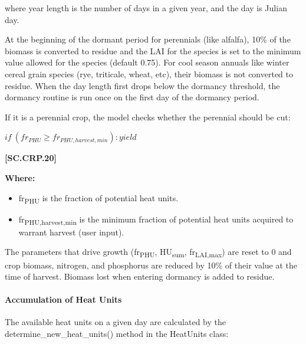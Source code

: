 where year length is the number of days in a given year, and the day is Julian day.

At the beginning of the dormant period for perennials (like alfalfa), 10\% of the biomass is converted to residue and the LAI for the species is set to the minimum value allowed for the species (default 0.75). For cool season annuals like winter cereal grain species (rye, triticale, wheat, etc), their biomass is not converted to residue.
When the day length first drops below the dormancy threshold, the dormancy routine is run once on the first day of the dormancy period.

If it is a perennial crop, the model checks whether the perennial should be cut:
    \vspace{0.2cm}

    \begin{center}
        \(if\ (fr_{PHU} \geq fr_{PHU,harvest,min}): yield	\)    
    \end{center}
        \vspace{0.5cm}
    
            {\raggedleft \textbf{[SC.CRP.20]}\par}
            \vspace{0.5cm}


\textbf{Where:}
    \begin{itemize}
        \item fr\textsubscript{PHU} is the fraction of potential heat units.
        \item fr\textsubscript{PHU,harvest,min} is the minimum fraction of potential heat units acquired to warrant  harvest (user input).
    \end{itemize}  

The parameters that drive growth (fr\textsubscript{PHU}, HU\textsubscript{sum}, fr\textsubscript{LAI,max}) are reset to 0 and crop biomass, nitrogen, and phosphorus are reduced by 10\% of their value at the time of harvest. Biomass lost when entering dormancy is added to residue.

\paragraph{Accumulation of Heat Units}
\vspace{-0.25cm}

The available heat units on a given day are calculated by the determine\_new\_heat\_units() method in the HeatUnits class:
    \vspace{0.2cm}

